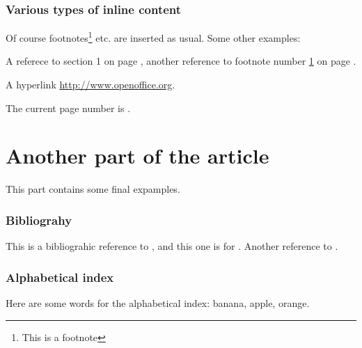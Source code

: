 \documentclass[12pt]{article}
\begin{document}
\section{Various types of inline content}
Of course footnotes\footnote{\label{fnt:ftn0}This is a footnote} etc.
are inserted as usual. Some other examples:

A referece to section 1 on page \pageref{ref:example}, another reference
to footnote number \ref{fnt:ftn0} on page \pageref{fnt:ftn0}.

A hyperlink
\href{http://www.openoffice.org/}{http://www.openoffice.org}.

The current page number is \thepage{}.

\part{Another part of the article}
This part contains some final expamples.

\section{Bibliograhy}
This is a bibliograhic reference to \cite{SAU99}, and this one is for
\cite{MEA99A}. Another reference to \cite{SAU99}.

\section{Alphabetical index}
Here are some words for the alphabetical index: banana,
apple, orange.



\printindex
\end{document}
